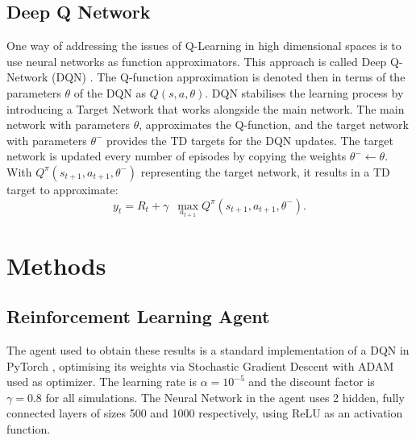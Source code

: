 \documentclass[conference]{IEEEtran}
\begin{document}
\subsection{Deep Q Network}
One way of addressing the issues of Q-Learning in high dimensional spaces is to use neural networks as function approximators. This approach is called Deep Q-Network (DQN) \cite{mnih2015}.
The Q-function approximation is denoted then in terms of the parameters $\theta$ of the DQN as $Q(s,a,\theta)$.
DQN stabilises the learning process by introducing a Target Network that works alongside the main network. 
The main network with parameters $\theta$, approximates the Q-function, and the target network with parameters $\theta^-$  provides the TD targets for the DQN updates. 
The target network is updated every number of episodes by copying the weights $\theta^- \leftarrow \theta$. With $Q^{\pi} (s_{t+1}, a_{t+1}, \theta^-)$ representing the target network, it results in a TD target to approximate:
\begin{equation}
y_t = R_t + \gamma \,\,\, \max_{a_{t+1}} Q^{\pi} (s_{t+1}, a_{t+1}, \theta^-).
\end{equation}
\section{Methods}
\label{methods}
\subsection{Reinforcement Learning Agent}
The agent used to obtain these results is a standard implementation of a DQN in PyTorch \cite{pytorch}, optimising its weights via Stochastic Gradient Descent \cite{kiefer} with ADAM \cite{adam} used as optimizer.
The learning rate is $\alpha=10^{-5}$ and the discount factor is $\gamma = 0.8$ for all simulations.
The Neural Network in the agent uses 2 hidden, fully connected layers of sizes 500 and 1000 respectively, using ReLU as an activation function.
\end{document}
